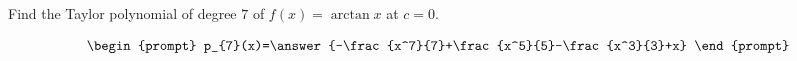 \documentclass{ximera}
\author{Gregory Hartman \and Matthew Carr}
\begin{document}
\begin{exercise}




Find the Taylor polynomial of degree $7$ of $f(x)=\arctan x$ at $c=0$.

\[
\begin{prompt}
p_{7}(x)=\answer{-\frac{x^7}{7}+\frac{x^5}{5}-\frac{x^3}{3}+x}
\end{prompt}
\]

\end{exercise}
\end{document}
